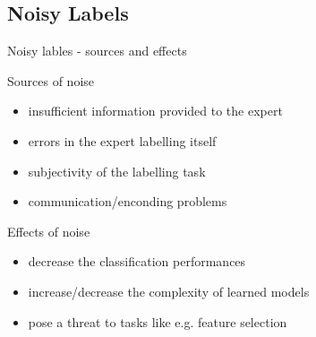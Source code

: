 \documentclass{beamer}\usepackage[]{graphicx}\usepackage[]{color}
\begin{document}
\subsection{Noisy Labels}
\begin{frame}[fragile]{Noisy lables - sources and effects\footnotemark[5]}
\small
\begin{minipage}[c]{0.6\textwidth}
\begin{block}{\small Sources of noise}
\begin{itemize}
\item insufficient information provided to the expert
\item errors in the expert labelling itself
\item subjectivity of the labelling task
\item communication/enconding problems
\end{itemize}
\end{block}
\begin{block}{\small Effects of noise}
\begin{itemize}
\item decrease the classification performances
\item increase/decrease the complexity of learned models
\item pose a threat to tasks like e.g. feature selection
\end{itemize}
\end{block}
\end{minipage}%
\begin{minipage}[c]{0.4\textwidth}
\begin{figure}%
    \centering
    \qquad

\end{figure}
\end{minipage}
\end{frame}
\end{document}

